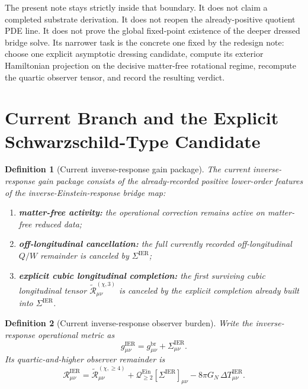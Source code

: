 \documentclass[11pt]{article}
\newcommand{\ReBridge}{g^{\mathrm{br}}}
\newcommand{\OpMetricIER}{g^{\mathrm{IER}}}
\newcommand{\SigmaIER}{\Sigma^{\mathrm{IER}}}
\newcommand{\ReLongThree}{\widetilde{\mathcal R}_{\mu\nu}^{(\chi,3)}}
\newcommand{\ReLongFour}{\widetilde{\mathcal R}_{\mu\nu}^{(\chi,\ge 4)}}
\newcommand{\EinQuad}{\mathcal Q_{\ge 2}^{\mathrm{Ein}}}
\newtheorem{definition}{Definition}
\begin{document}
The present note stays strictly inside that boundary. It does not claim a completed substrate derivation. It does not reopen the already-positive quotient PDE line. It does not prove the global fixed-point existence of the deeper dressed bridge solve. Its narrower task is the concrete one fixed by the redesign note: choose one explicit asymptotic dressing candidate, compute its exterior Hamiltonian projection on the decisive matter-free rotational regime, recompute the quartic observer tensor, and record the resulting verdict.

\section{Current Branch and the Explicit Schwarzschild-Type Candidate}

\begin{definition}[Current inverse-response gain package]
\label{def:gains}
The \emph{current inverse-response gain package} consists of the already-recorded positive lower-order features of the inverse-Einstein-response bridge map:
\begin{enumerate}
    \item \textbf{matter-free activity:} the operational correction remains active on matter-free reduced data;
    \item \textbf{off-longitudinal cancellation:} the full currently recorded off-longitudinal \(Q/W\) remainder is canceled by \(\SigmaIER\);
    \item \textbf{explicit cubic longitudinal completion:} the first surviving cubic longitudinal tensor \(\ReLongThree\) is canceled by the explicit completion already built into \(\SigmaIER\).
\end{enumerate}
\end{definition}

\begin{definition}[Current inverse-response observer burden]
\label{def:old}
Write the inverse-response operational metric as
\begin{equation}
\OpMetricIER_{\mu\nu}
=
\ReBridge_{\mu\nu}
+\SigmaIER_{\mu\nu}.
\label{eq:gier}
\end{equation}
Its quartic-and-higher observer remainder is
\begin{equation}
\mathcal R_{\mu\nu}^{\mathrm{IER}}
=
\ReLongFour
+\EinQuad[\SigmaIER]_{\mu\nu}
-8\pi G_N\,\Delta T_{\mu\nu}^{\mathrm{IER}}.
\label{eq:oldrem}
\end{equation}
\end{definition}
\end{document}
